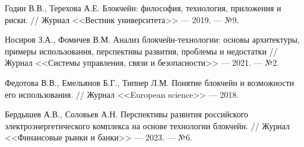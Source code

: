 \documentclass{mirea-article}
\begin{document}
\begin{thebibliography}{99\kern\bibindent}
     Годин В.В., Терехова А.Е. Блокчейн: философия, технология, приложения и риски. // Журнал <<Вестник университета>> --- 2019. --- №9.

     Носиров З.А., Фомичев В.М. Анализ блокчейн-технологии: основы архитектуры, примеры использования, перспективы развития, проблемы и недостатки // Журнал <<Системы управления, связи и безопасности>> --- 2021. --- №2.

     Федотова В.В., Емельянов Б.Г., Типнер Л.М. Понятие блокчейн и возможности его использования. // Журнал <<European science>> --- 2018.

     Бердышев А.В., Соловьев А.Н. Перспективы развития российского электроэнергетического комплекса на основе технологии блокчейн. // Журнал <<Финансовые рынки и банки>> --- 2023. --- №6.
\end{thebibliography}
\end{document}
